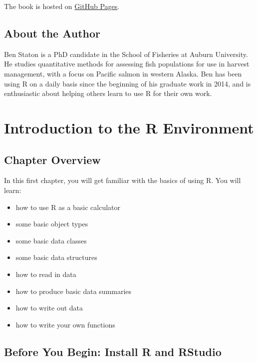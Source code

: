 \documentclass[]{book}
\providecommand{\tightlist}{%
  \setlength{\itemsep}{0pt}\setlength{\parskip}{0pt}}
\theoremstyle{definition}
\theoremstyle{definition}
\theoremstyle{definition}
\theoremstyle{remark}
\begin{document}
The book is hosted on \href{https://pages.github.com/}{GitHub Pages}.

\section*{About the Author}\label{about-the-author}

Ben Staton is a PhD candidate in the School of Fisheries at Auburn
University. He studies quantitative methods for assessing fish
populations for use in harvest management, with a focus on Pacific
salmon in western Alaska. Ben has been using R on a daily basis since
the beginning of his graduate work in 2014, and is enthusiastic about
helping others learn to use R for their own work.

\chapter{Introduction to the R Environment}\label{ch1}

\section*{Chapter Overview}\label{chapter-overview}

In this first chapter, you will get familiar with the basics of using R.
You will learn:

\begin{itemize}
\tightlist
\item
  how to use R as a basic calculator
\item
  some basic object types
\item
  some basic data classes
\item
  some basic data structures
\item
  how to read in data
\item
  how to produce basic data summaries
\item
  how to write out data
\item
  how to write your own functions
\end{itemize}

\section*{Before You Begin: Install R and
RStudio}\label{before-you-begin-install-r-and-rstudio}
\end{document}
